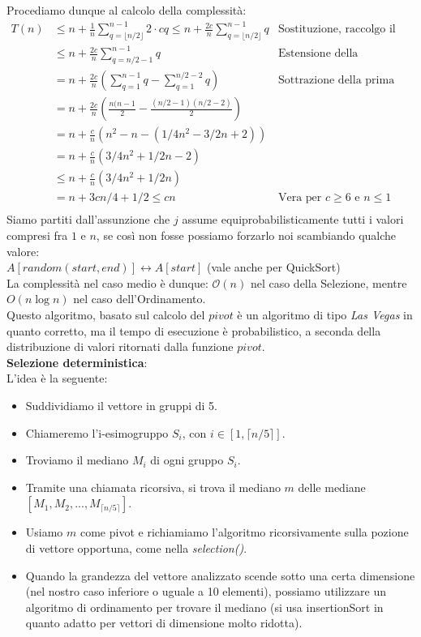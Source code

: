 \documentclass[../cheatSheetAlgoritmi.tex]{subfiles}
\begin{document}
Procediamo dunque al calcolo della complessità:
\begin{align*}
	 T(n) & \leq n + \frac{1}{n} \sum_{q = \lfloor n/2 \rfloor}^{n-1} 2  \cdot cq \leq n + \frac{2c}{n} \sum_{q = \lfloor n/2 \rfloor}^{n-1} q & \text{Sostituzione, raccolgo il fattore 2} \\
	& \leq n + \frac{2c}{n} \sum_{q = n/2 - 1}^{n-1} q & \text{Estensione della sommatoria} \\
	& = n + \frac{2c}{n} \left( \sum_{q = 1}^{n-1} q -  \sum_{q = 1}^{n/2 - 2} q \right) & \text{Sottrazione della prima parte} \\
	& = n + \frac{2c}{n} \left( \frac{n (n - 1}{2} - \frac{(n/2 - 1)(n/2 - 2)}{2}\right) &\\
	& = n + \frac{c}{n} \left(n^2 - n - (1/4 n^2 - 3/2n + 2) \right) & \\
	& = n + \frac{c}{n} \left(3/4n^2 + 1/2 n - 2 \right) & \\
	& \leq n + \frac{c}{n} \left(3/4n^2 + 1/2 n \right) & \\
	& = n + 3cn/4 +1/2 \leq cn & \text{Vera per $c \geq 6$ e $n \leq 1$} \\
\end{align*}
Siamo partiti dall’assunzione che $j$ assume equiprobabilisticamente tutti i valori compresi fra $1$ e $n$, se così non fosse possiamo forzarlo noi scambiando qualche valore: \\
$A[random(start,end)] \leftrightarrow A[start]$ (vale anche per QuickSort)\\
La complessità nel caso medio è dunque: $\mathcal{O}(n)$ nel caso della Selezione, mentre $O(n \log n)$ nel caso dell’Ordinamento. \\
Questo algoritmo, basato sul calcolo del $pivot$ è un algoritmo di tipo \emph{Las Vegas} in quanto corretto, ma il tempo di esecuzione è probabilistico, a seconda della distribuzione di valori ritornati dalla funzione $pivot$. \\
\textbf{Selezione deterministica}: \\
L'idea è la seguente:
\begin{itemize}
	\item Suddividiamo il vettore in gruppi di 5.
	\item Chiameremo l’i-esimogruppo $S_i$, con $i \in [1, \lceil n/5 \rceil]$. 
	\item Troviamo il mediano $M_i$ di ogni gruppo $S_i$. 
	\item Tramite una chiamata ricorsiva, si trova il mediano $m$ delle mediane $[M_1,M_2,...,M_{\lceil n/5 \rceil}]$. 
	\item Usiamo $m$ come pivot e richiamiamo l'algoritmo ricorsivamente sulla pozione di vettore opportuna, come nella \emph{selection()}.
	\item Quando la grandezza del vettore analizzato scende sotto una certa dimensione (nel nostro caso inferiore o uguale a 10 elementi), possiamo utilizzare un algoritmo di ordinamento per trovare il mediano (si usa insertionSort in quanto adatto per vettori di dimensione molto ridotta).
\end{itemize}
\end{document}
